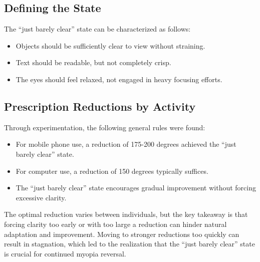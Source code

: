 \documentclass[12pt]{article}
\begin{document}
\subsection{Defining the State}
The ``just barely clear'' state can be characterized as follows:
\begin{itemize}
    \item Objects should be sufficiently clear to view without straining.
    \item Text should be readable, but not completely crisp.
    \item The eyes should feel relaxed, not engaged in heavy focusing efforts.
\end{itemize}

\subsection{Prescription Reductions by Activity}
Through experimentation, the following general rules were found:
\begin{itemize}
    \item For mobile phone use, a reduction of 175-200 degrees achieved the ``just barely clear'' state.
    \item For computer use, a reduction of 150 degrees typically suffices.
    \item The ``just barely clear'' state encourages gradual improvement without forcing excessive clarity.
\end{itemize}

The optimal reduction varies between individuals, but the key takeaway is that forcing clarity too early or with too large a reduction can hinder natural adaptation and improvement. Moving to stronger reductions too quickly can result in stagnation, which led to the realization that the ``just barely clear'' state is crucial for continued myopia reversal.
\end{document}
